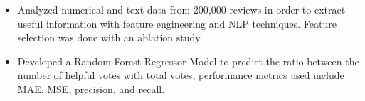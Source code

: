 \documentclass[10pt,a4paper]{altacv}
\begin{document}
\medskip




\begin{itemize}
  \item \small Analyzed numerical and text data from 200,000 reviews in order to extract useful information with feature engineering and NLP techniques. Feature selection was done with an ablation study. 
    \item \small Developed a Random Forest Regressor Model to predict the ratio between the number of helpful votes with total votes, performance metrics used include MAE, MSE, precision, and recall. 
\end{itemize}

\medskip




\end{document}

